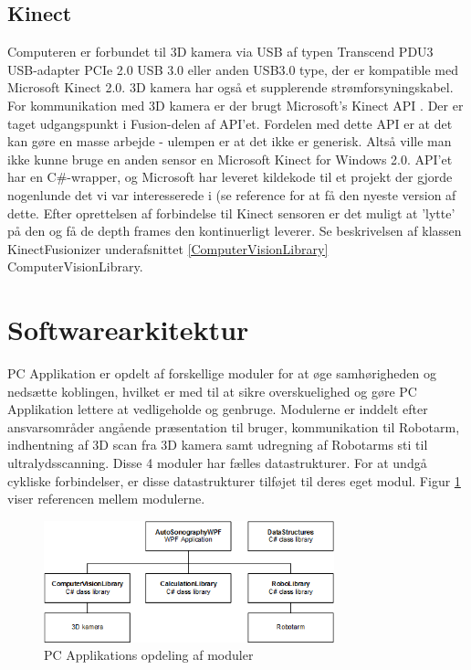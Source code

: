 \subsection{Kinect}
Computeren er forbundet til 3D kamera via USB af typen Transcend PDU3 USB-adapter PCIe 2.0 USB 3.0 eller anden USB3.0 type, der er kompatible med Microsoft Kinect 2.0. 3D kamera har også et supplerende strømforsyningskabel.
For kommunikation med 3D kamera er der brugt Microsoft's Kinect API \cite{KinectAPI} .
Der er taget udgangspunkt i Fusion-delen \cite{KinectFusion} af API'et. Fordelen med dette API er at det kan gøre en masse arbejde - ulempen er at det ikke er generisk. Altså ville man ikke kunne bruge en anden sensor en Microsoft Kinect for Windows 2.0. API'et har en C\#-wrapper, og Microsoft har leveret kildekode til et projekt der gjorde nogenlunde det vi var interesserede i (se reference \cite{KinectFusionExplorer} for at få den nyeste version af dette.
Efter oprettelsen af forbindelse til Kinect sensoren er det muligt at 'lytte' på den og få de depth frames den kontinuerligt leverer. Se beskrivelsen af klassen KinectFusionizer underafsnittet \ref{ComputerVisionLibrary}  ComputerVisionLibrary. 

\newpage

\section{Softwarearkitektur}
PC Applikation er opdelt af forskellige moduler for at øge samhørigheden og nedsætte koblingen, hvilket er med til at sikre overskuelighed og gøre PC Applikation lettere at vedligeholde og genbruge. Modulerne er inddelt efter ansvarsområder angående præsentation til bruger, kommunikation til Robotarm, indhentning af 3D scan fra 3D kamera samt udregning af Robotarms sti til ultralydsscanning. Disse 4 moduler har fælles datastrukturer. For at undgå cykliske forbindelser, er disse datastrukturer tilføjet til deres eget modul. Figur \ref{Layers} viser referencen mellem modulerne. 

\begin{figure}[H]
    \centering
    \includegraphics[width=0.75\textwidth]{figurer/d/Design/Layers}
    \caption{PC Applikations opdeling af moduler}
    \label{Layers}
\end{figure}


